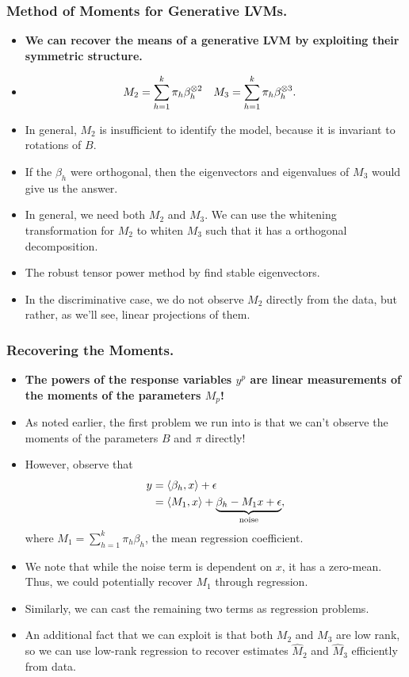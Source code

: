 \documentclass[xcolor={svgnames}]{beamer}
\begin{document}
\begin{frame}
  \frametitle{Method of Moments for Generative LVMs.}

  \begin{itemize}
    \item {\bf We can recover the means of a generative LVM by exploiting their symmetric structure. }
    \item 
    \begin{align*}
    M_2 &= \sum_{h=1}^k \pi_h \beta_h^{\otimes 2} & M_3 &= \sum_{h=1}^k \pi_h \beta_h^{\otimes 3}.
  \end{align*}
    \item In general, $M_2$ is insufficient to identify the model, because it is invariant to rotations of $B$. 
    \item If the $\beta_h$ were orthogonal, then the eigenvectors and eigenvalues of $M_3$ would give us the answer. 
    \item In general, we need both $M_2$ and $M_3$. We can use the whitening transformation for $M_2$ to whiten $M_3$ such that it has a orthogonal decomposition.
\item The robust tensor power method by \cite{AnandkumarHsuGe2012} find stable eigenvectors.
  \item In the discriminative case, we do not observe $M_2$ directly from the data, but rather, as we'll see, linear projections of them.
  \end{itemize}
\end{frame}

\begin{frame}
  \frametitle{Recovering the Moments.}
  \begin{itemize}
    \item {\bf The powers of the response variables $y^p$ are linear measurements of the moments of the parameters $M_p$!}
    \item As noted earlier, the first problem we run into is that we can't observe the moments of the parameters $B$ and $\pi$ directly!
\item However, observe that 
\begin{align}
  y &= \langle \beta_h, x \rangle + \epsilon \\
    &= \langle M_1, x \rangle + \underbrace{{\beta_h - M_1}{x} + \epsilon }_{\textrm{noise}},
\end{align}
  where $M_1 = \sum_{h=1}^k \pi_h \beta_h$, the mean regression coefficient. 
  \item We note that while the noise term is dependent on $x$, it has a zero-mean. Thus, we could potentially recover $M_1$ through regression.
\item Similarly, we can cast the remaining two terms as regression problems.

\item An additional fact that we can exploit is that both $M_2$ and $M_3$ are low rank, so we can use low-rank regression to recover estimates $\hat M_2$ and $\hat M_3$ efficiently from data.
  \end{itemize}
\end{frame}
\end{document}
